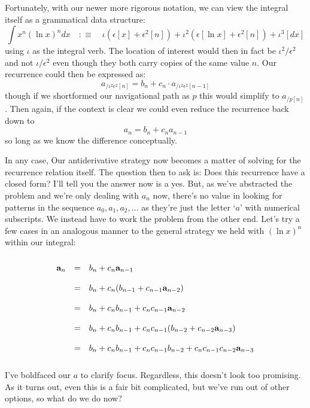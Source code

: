\documentclass[twoside]{article}
\begin{document}
Fortunately, with our newer more rigorous notation, we can view the integral itself as a grammatical data structure:
$$ \int x^n(\ln x)^n dx \quad:\equiv\quad
\iota(\epsilon[x]+\epsilon^2[n])+\iota^2(\epsilon[\ln x]+\epsilon^2[n])+\iota^3[dx] $$
using $ \iota $ as the integral verb. The location of interest would then in fact be $ \iota^2/\epsilon^2 $ and not
$ \iota/\epsilon^2 $ even though they both carry copies of the same value $ n $. Our recurrence could then be expressed as:
$$ a_{/\iota^2\epsilon^2[n]}=b_n+c_n\cdot a_{/\iota^2\epsilon^2[n-1]} $$
though if we shortformed our navigational path as $ p $ this would simplify to $ a_{/p[n]} $.
Then again, if the context is clear we could even reduce the recurrence back down to
$$ a_n=b_n+c_na_{n-1} $$
so long as we know the difference conceptually.

In any case, Our antiderivative strategy now becomes a matter of solving for the recurrence relation itself.
The question then to ask is: Does this recurrence have a closed form? I'll tell you the answer now is a yes.
But, as we've abstracted the problem and we're only dealing with $ a_n $ now, there's no value in looking
for patterns in the sequence $ a_0, a_1, a_2,\ldots $ as they're just the letter `$ a $' with numerical subscripts.
We instead have to work the problem from the other end. Let's try a few cases in an analogous manner to the general
strategy we held with $ (\ln x)^n $ within our integral:
$$ \begin{array}{rcl}
											\\
{\bf a}_n	& = & b_n+c_n{\bf a}_{n-1}						\\
											\\
		& = & b_n+c_n(b_{n-1}+c_{n-1}{\bf a}_{n-2})				\\
     											\\
		& = & b_n+c_nb_{n-1}+c_nc_{n-1}{\bf a}_{n-2}				\\
     											\\
		& = & b_n+c_nb_{n-1}+c_nc_{n-1}(b_{n-2}+c_{n-2}{\bf a}_{n-3})		\\
     											\\
		& = & b_n+c_nb_{n-1}+c_nc_{n-1}b_{n-2}+c_nc_{n-1}c_{n-2}{\bf a}_{n-3}	\\
											\\
\end{array} $$
I've boldfaced our $ a $ to clarify focus. Regardless, this doesn't look too promising. As it turns out,
even this is a fair bit complicated, but we've run out of other options, so what do we do now?
\end{document}
